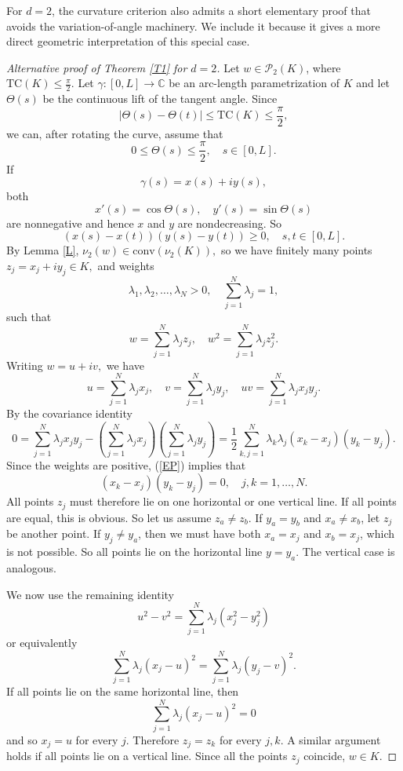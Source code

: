 \documentclass[reqno]{amsart}
\theoremstyle{definition}
\newcommand{\C}{\mathbb{C}}
\newcommand{\Conv}{{\mathrm{conv}}}
\newcommand{\T}{\mathrm{TC}}
\newcommand{\cP}{\mathcal{P}}
\numberwithin{equation}{section}
\begin{document}
For $d=2$, the curvature criterion also admits a short elementary proof
that avoids the variation-of-angle machinery. We include it because it
gives a more direct geometric interpretation of this special case.

\begin{proof}[Alternative proof of Theorem \ref{T1} for $d=2$] 
Let $w\in\cP_2(K)$, where $\T(K)\le\frac{\pi}{2}$. Let $\gamma:[0,L]\to\C$ be an arc-length parametrization of $K$ and let $\Theta(s)$ be the continuous lift of the tangent angle. Since 
\[|\Theta(s)-\Theta(t)|\le \T(K)\le\frac{\pi}{2},\] we can, after rotating the curve, assume that
\[0\le \Theta(s)\le \frac{\pi}{2},\quad s\in[0,L].\] 
If \[\gamma(s)=x(s)+iy(s),\]
both 
\[x'(s)=\cos \Theta(s),\quad y'(s)=\sin \Theta(s)\]
are nonnegative and hence $x$ and $y$ are nondecreasing. So 
\begin{equation} \label{EP}(x(s)-x(t))(y(s)-y(t))\ge 0,\quad s,t\in[0,L].\end{equation}
By Lemma \ref{L}, $\nu_2(w)\in\Conv(\nu_2(K)),$
so we have finitely many points $z_j=x_j+iy_j\in K,$ and 
weights
\[\lambda_1,\lambda_2,\ldots,\lambda_N>0,\quad \sum_{j=1}^N\lambda_j=1,\] such that
\[w=\sum_{j=1}^N\lambda_jz_j,\quad w^2=\sum_{j=1}^N\lambda_jz_j^2.\] 
Writing $w=u+iv,$
we have 
\[u=\sum_{j=1}^N\lambda_{j}x_j,\quad v=\sum_{j=1}^N\lambda_{j}y_j,\quad uv=\sum_{j=1}^N\lambda_{j}x_jy_j.\]
By the covariance identity
\[0=\sum_{j=1}^N\lambda_{j}x_jy_j-\left(\sum_{j=1}^N\lambda_{j}x_j\right)\left(\sum_{j=1}^N\lambda_{j}y_j\right)=\frac{1}{2}\sum_{k,j=1}^N\lambda_k\lambda_j(x_k-x_j)(y_k-y_j).\]
Since the weights are positive, (\ref{EP}) implies that
\[(x_k-x_j)(y_k-y_j)=0,\quad j,k=1,\ldots,N.\] 
All points $z_j$ must therefore lie on one horizontal or one vertical line. If all points are equal, this is obvious. So let us assume $z_a\ne z_b$. If $y_a=y_b$ and $x_a\neq x_b$, let $z_j$ be another point. If $y_j\neq y_a$, then we must have both $x_a=x_j$ and $x_b=x_j$, which is not possible. So all points lie on the horizontal line $y=y_a$. The vertical case is analogous.

We now use the remaining identity
\[u^2-v^2=\sum_{j=1}^N\lambda_j(x_j^2-y_j^2)\]
or equivalently
\[\sum_{j=1}^N\lambda_j(x_j-u)^2=\sum_{j=1}^N\lambda_j(y_j-v)^2.\]
If all points lie on the same horizontal line, then  
\[\sum_{j=1}^N\lambda_j(x_j-u)^2=0\] 
and so $x_j=u$ for every $j$. Therefore $z_j=z_k$ for every $j,k$. A similar argument holds if all points lie on a vertical line. 
Since all the points $z_j$ coincide, $w\in K$. 
\end{proof}
\end{document}
